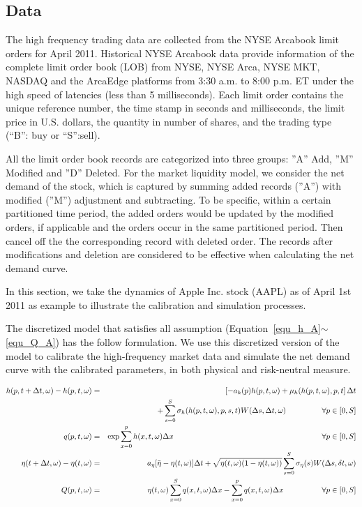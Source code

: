 \documentclass{article}
\begin{document}
\subsection{Data}

The high frequency trading data are collected from the NYSE Arcabook limit
orders for April 2011. Historical NYSE Arcabook data provide information of
the complete limit order book (LOB) from NYSE, NYSE Arca, NYSE MKT, NASDAQ
and the ArcaEdge platforms from 3:30 a.m. to 8:00 p.m. ET under the high
speed of latencies (less than 5 milliseconds). Each limit order contains the
unique reference number, the time stamp in seconds and milliseconds, the
limit price in U.S. dollars, the quantity in number of shares, and the
trading type (``B'': buy or ``S'':sell).

All the limit order book records are categorized into three groups: ''A''
Add, ''M'' Modified and ''D'' Deleted. For the market liquidity model, we
consider the net demand of the stock, which is captured by summing added
records (''A'') with modified (''M'') adjustment and subtracting. To be
specific, within a certain partitioned time period, the added orders would
be updated by the modified orders, if applicable and the orders occur in the
same partitioned period. Then cancel off the the corresponding record with
deleted order. The records after modifications and deletion are considered
to be effective when calculating the net demand curve.

In this section, we take the dynamics of Apple Inc. stock (AAPL) as of April
1st 2011 as example to illustrate the calibration and simulation processes.

\bigskip

The discretized model that satisfies all assumption (Equation~\ref{equ_h_A}$%
\sim$\ref{equ_Q_A}) has the follow formulation. We use this discretized
version of the model to calibrate the high-frequency market data and
simulate the net demand curve with the calibrated parameters, in both
physical and risk-neutral measure.

\begin{eqnarray*}
h(p,t+\Delta t,\omega ) - h(p,t,\omega ) &=& \left[-a_{h}(p)h(p,t,\omega
)+\mu _{h}(h(p,t,\omega ),p,t\right]\Delta t \\
& & +\sum_{s=0}^{S}\sigma _{h}(h(p,t,\omega ),p,s,t)W(\Delta s,\Delta
t,\omega ) \text{ \ \ \ \ \ \ \ \ \ \ \ }\forall p\in \lbrack 0,S] \\
q(p,t,\omega ) &=&\exp {\sum_{x=0}^{p}h(x,t,\omega )\Delta x}\text{ \ \ \ \
\ \ \ \ \ \ \ \ \ \ \ \ \ \ \ \ \ \ \ \ \ \ \ \ \ \ \ \ \ \ \ \ \ \ \ \ \ \
\ \ \ \ \ \ \ \ \ \ \ \ \ }\forall p\in \lbrack 0,S] \\
\eta (t+\Delta t,\omega ) - \eta (t,\omega ) &=&a_{\eta }[\bar{\eta}-\eta
(t,\omega )]\Delta t+\sqrt{\eta (t,\omega )(1-\eta (t,\omega ))}%
\sum_{s=0}^{S}\sigma _{\eta }(s)W(\Delta s,\delta t,\omega ) \\
Q(p,t,\omega ) &=&\eta (t,\omega )\sum_{x=0}^{S}q(x,t,\omega )\Delta
x-\sum_{x=0}^{p}q(x,t,\omega )\Delta x\text{ \ \ \ \ \ \ \ \ \ \ \ \ }%
\forall p\in \lbrack 0,S]
\end{eqnarray*}
\end{document}
